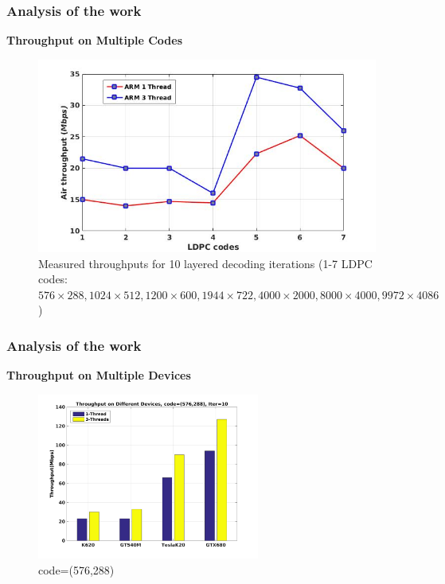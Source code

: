 \documentclass{beamer}
\begin{document}
\begin{frame}
  \frametitle{Analysis of the work}
  \textbf{Throughput on Multiple Codes}
  \begin{figure}[h]
\begin{centering}
\includegraphics[scale=0.3]{img/air.jpg}
\caption[width=.5\textwidth]{Measured throughputs for 10 layered decoding iterations (1-7 LDPC codes: $576 \times 288, 1024 \times 512, 1200 \times 600, 1944 \times 722, 4000 \times 2000, 8000 \times 4000, 9972 \times 4086$)}
\end{centering}
\end{figure}
  
\end{frame}
\begin{frame}
  \frametitle{Analysis of the work}
  \textbf{Throughput on Multiple Devices}

  \begin{figure}
    \includegraphics[width=0.65\textwidth]{img/c_576_10.jpg}
    \caption{code=(576,288)}
  \end{figure}
  
  \end{frame}
  
\end{document}

